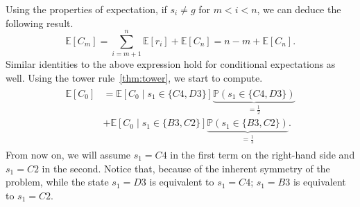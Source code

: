 %
Using the properties of expectation, if $s_i \neq g$ for $m < i < n$, we can
deduce the following result.
%
\begin{equation*} 
    \mathbb{E}[C_m] = \sum_{i=m+1}^n \mathbb{E}[r_i] + \mathbb{E}[C_n] = n-m + \mathbb{E}[C_n].
\end{equation*}
%
Similar identities to the above expression hold for conditional expectations as
well. Using the tower rule~\ref{thm:tower}, we start to compute.
\begin{align}
   \begin{split}
    \mathbb{E}[C_0] &= \mathbb{E}\left[ C_0 \mid s_1 \in \{C4, D3\} \right] 
    \underbrace{\mathbb{P}(s_1 \in \{C4, D3\})}_{=\frac{1}{2}} \\ 
    &+
    \mathbb{E}\left[ C_0 \mid s_1 \in \{B3, C2\} 
    \right] \underbrace{\mathbb{P}(s_1 \in \{B3, C2\})}_{=\frac{1}{2}}.
    \end{split}
    \label{eq:tower1}
\end{align}
%
From now on, we will assume $s_1 = C4$ in the first term on the right-hand side
and $s_1 = C2$ in the second. Notice that, because of the inherent symmetry of
the problem, while the state $s_1 = D3$ is equivalent to $s_1 = C4$; $s_1 =
B3$ is equivalent to $s_1 = C2$.

